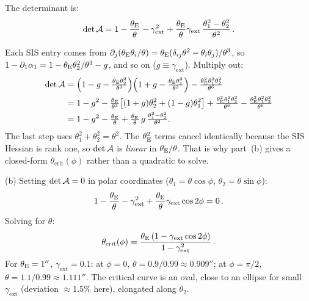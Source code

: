 The determinant is:
\begin{equation*}
    \det\mathcal{A} = 1 - \frac{\theta_{\mathrm{E}}}{\theta}
    - \gamma_{\mathrm{ext}}^2
    + \frac{\theta_{\mathrm{E}}}{\theta}\gamma_{\mathrm{ext}}\,
    \frac{\theta_1^2 - \theta_2^2}{\theta^2} \,.
\end{equation*}

\begin{derivation}
Each SIS entry comes from
$\partial_j(\theta_{\mathrm{E}}\theta_i/\theta) = \theta_{\mathrm{E}}(\delta_{ij}\theta^2 - \theta_i\theta_j)/\theta^3$,
so $1 - \partial_1\alpha_1 = 1 - \theta_{\mathrm{E}}\theta_2^2/\theta^3 - g$, and so on
($g \equiv \gamma_{\mathrm{ext}}$).  Multiply out:
\begin{align*}
  \det\mathcal{A}
  &= \Big(1-g-\tfrac{\theta_{\mathrm{E}}\theta_2^2}{\theta^3}\Big)\Big(1+g-\tfrac{\theta_{\mathrm{E}}\theta_1^2}{\theta^3}\Big)
     - \tfrac{\theta_{\mathrm{E}}^2\theta_1^2\theta_2^2}{\theta^6}\\
  &= 1 - g^2 - \tfrac{\theta_{\mathrm{E}}}{\theta^3}\big[(1+g)\theta_2^2 + (1-g)\theta_1^2\big]
     + \tfrac{\theta_{\mathrm{E}}^2\theta_1^2\theta_2^2}{\theta^6} - \tfrac{\theta_{\mathrm{E}}^2\theta_1^2\theta_2^2}{\theta^6}\\
  &= 1 - g^2 - \tfrac{\theta_{\mathrm{E}}}{\theta} + \tfrac{\theta_{\mathrm{E}}}{\theta}\,g\,\tfrac{\theta_1^2-\theta_2^2}{\theta^2}.
\end{align*}
The last step uses $\theta_1^2 + \theta_2^2 = \theta^2$.  The $\theta_{\mathrm{E}}^2$ terms
cancel identically because the SIS Hessian is rank one, so $\det\mathcal{A}$ is
\emph{linear} in $\theta_{\mathrm{E}}/\theta$.  That is why part~(b) gives a closed-form
$\theta_{\mathrm{crit}}(\phi)$ rather than a quadratic to solve.
\end{derivation}


(b) Setting $\det\mathcal{A} = 0$ in polar coordinates
($\theta_1 = \theta\cos\phi$, $\theta_2 = \theta\sin\phi$):
\begin{equation*}
    1 - \frac{\theta_{\mathrm{E}}}{\theta} - \gamma_{\mathrm{ext}}^2
    + \frac{\theta_{\mathrm{E}}}{\theta}\gamma_{\mathrm{ext}}\cos 2\phi = 0 \,.
\end{equation*}
Solving for $\theta$:
\begin{equation*}
    \theta_{\mathrm{crit}}(\phi) = \frac{\theta_{\mathrm{E}}\,
    (1 - \gamma_{\mathrm{ext}}\cos 2\phi)}{1 - \gamma_{\mathrm{ext}}^2} \,.
\end{equation*}
For $\theta_{\mathrm{E}} = 1''$, $\gamma_{\mathrm{ext}} = 0.1$: at $\phi = 0$,
$\theta = 0.9/0.99 \approx 0.909''$; at $\phi = \pi/2$,
$\theta = 1.1/0.99 \approx 1.111''$.  The critical curve is an
oval, close to an ellipse for small $\gamma_{\mathrm{ext}}$ (deviation
$\approx 1.5\%$ here), elongated along $\theta_2$. \checkmark


